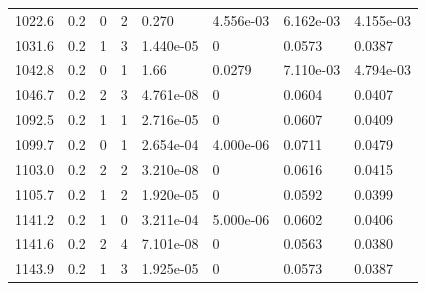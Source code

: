 \documentclass[preview]{standalone}
\begin{document}
{{{\begin{tabular}{L{1.2cm}C{1.2cm} C{0.3cm}C{0.5cm} C{1.4cm}C{1.4cm} C{1.4cm}C{1.4cm}}
  1022.6  &   0.2  & 0     &  2 &  0.270  & 4.556e-03  & 6.162e-03 &  4.155e-03   \\ 
  1031.6  &   0.2  & 1     &  3 &  1.440e-05  & 0  & 0.0573 &  0.0387   \\ 
  1042.8  &   0.2  & 0     &  1 &  1.66  & 0.0279  & 7.110e-03 &  4.794e-03   \\ 
  1046.7  &   0.2  & 2     &  3 &  4.761e-08  & 0  & 0.0604 &  0.0407   \\ 
  1092.5  &   0.2  & 1     &  1 &  2.716e-05  & 0  & 0.0607 &  0.0409   \\ 
  1099.7  &   0.2  & 0     &  1 &  2.654e-04  & 4.000e-06  & 0.0711 &  0.0479   \\ 
  1103.0  &   0.2  & 2     &  2 &  3.210e-08  & 0  & 0.0616 &  0.0415   \\ 
  1105.7  &   0.2  & 1     &  2 &  1.920e-05  & 0  & 0.0592 &  0.0399   \\ 
  1141.2  &   0.2  & 1     &  0 &  3.211e-04  & 5.000e-06  & 0.0602 &  0.0406   \\ 
  1141.6  &   0.2  & 2     &  4 &  7.101e-08  & 0  & 0.0563 &  0.0380   \\ 
  1143.9  &   0.2  & 1     &  3 &  1.925e-05  & 0  & 0.0573 &  0.0387   \\ 
\hline 
\end{tabular} 

}}}
\end{document}
